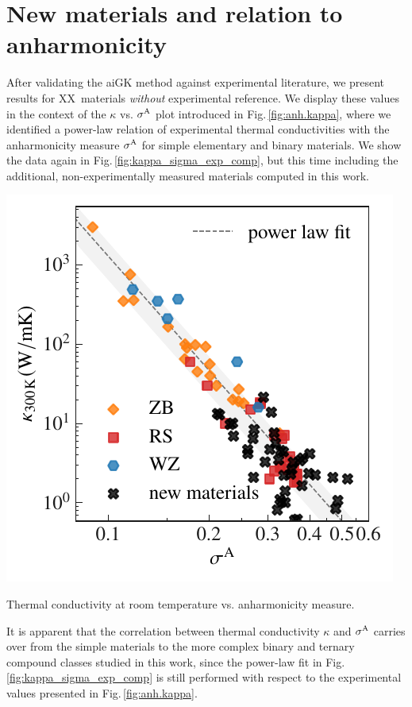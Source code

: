 \section{New materials and relation to anharmonicity}
After validating the aiGK method against experimental literature, we present results for XX~materials \emph{without} experimental reference. We display these values in the context of the $\kappa$ vs. $\sigma^\mathrm{A}$ plot introduced in Fig.\,\ref{fig:anh.kappa}, where we identified a power-law relation of experimental thermal conductivities with the anharmonicity measure $\sigma^\mathrm{A}$ for simple elementary and binary materials. We show the data again in Fig.\,\ref{fig:kappa_sigma_exp_comp}, but this time including the additional, non-experimentally measured materials computed in this work.
%
\begin{marginfigure}
	\includegraphics[width=\textwidth]{./data/plots/anharmonicity/9_kappa/incl_computations/sigma_vs_kappa_annot_comp_margin.pdf}
	\caption{Thermal conductivity at room temperature vs. anharmonicity measure.}
	\label{fig:kappa_sigma_exp_comp}
\end{marginfigure}
%
It is apparent that the correlation between thermal conductivity $\kappa$ and $\sigma^\mathrm{A}$ carries over from the simple materials to the more complex binary and ternary compound classes studied in this work, since the power-law fit in Fig.\,\ref{fig:kappa_sigma_exp_comp} is still performed with respect to the experimental values presented in Fig.\,\ref{fig:anh.kappa}.


